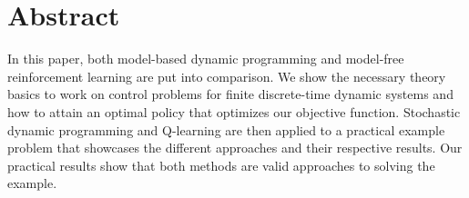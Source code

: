 
\chapter*{Abstract}
\label{cha:abstract}

In this paper, both model-based dynamic programming and model-free reinforcement learning are put into comparison. We show the necessary theory basics to work on control problems for finite discrete-time dynamic systems and how to attain an optimal policy that optimizes our objective function. Stochastic dynamic programming and Q-learning are then applied to a practical example problem that showcases the different approaches and their respective results. Our practical results show that both methods are valid approaches to solving the example.
